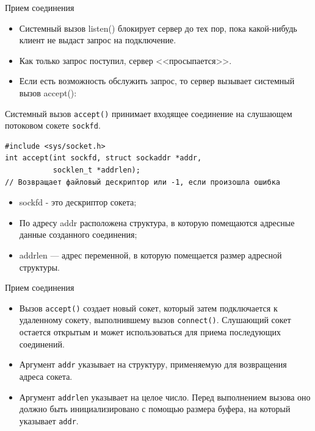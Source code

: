 \documentclass{beamer}
\begin{document}
\begin{frame}[fragile]{Прием соединения}
	\begin{itemize}
		\item Системный вызов listen() блокирует сервер до тех пор, пока какой-нибудь клиент не выдаст запрос на подключение. 
		\item Как только запрос поступил, сервер <<просыпается>>. 
		\item Если есть возможность обслужить запрос, то сервер вызывает системный вызов accept():
	\end{itemize}	
	
	Системный вызов \texttt{accept()} принимает входящее соединение на слушающем потоковом сокете \texttt{sockfd}.
\begin{verbatim}
#include <sys/socket.h>
int accept(int sockfd, struct sockaddr *addr, 
           socklen_t *addrlen);
// Возвращает файловый дескриптор или -1, если произошла ошибка
\end{verbatim}

	\begin{itemize}
		\item sockfd - это дескриптор сокета;
		\item По адресу addr расположена структура, в которую помещаются адресные данные созданного соединения; 
		\item addrlen — адрес переменной, в которую помещается размер адресной структуры.
	\end{itemize}
\end{frame}

\begin{frame}[fragile]{Прием соединения}
	\begin{itemize}
		\item Вызов \texttt{accept()} создает новый сокет, который затем подключается к удаленному сокету, выполнившему вызов \texttt{connect()}. Слушающий сокет остается открытым и может использоваться для приема последующих соединений.
		\item Аргумент \texttt{addr} указывает на структуру, применяемую для возвращения адреса сокета.
		\item Аргумент \texttt{addrlen} указывает на целое число. Перед выполнением вызова оно должно быть инициализировано с помощью размера буфера, на который указывает \texttt{addr}. 
	\end{itemize}   
\end{frame}
\end{document}
